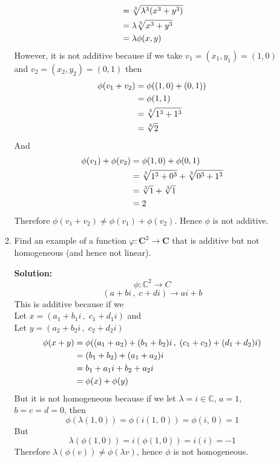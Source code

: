 \documentclass[12pt]{article}
\newcommand{\C}{\mathbb{C}}
\begin{document}
\begin{enumerate}
\begin{enumerate}
\begin{mybox}
\begin{align}
            &= \sqrt[3]{\lambda^3(x^3+y^3)} \notag\\
            &= \lambda \sqrt[3]{x^3+y^3} \notag\\
            &= \lambda \phi(x,y)\notag
        \end{align}
        However, it is not additive because if we take $v_1 = (x_1, y_1) = (1,0)$ and $v_2 = (x_2, y_2) = (0,1)$ then
        \begin{align}
            \phi(v_1 + v_2) &= \phi((1,0) + (0,1)) \notag\\
            &= \phi(1,1) \notag\\
            &= \sqrt[3]{1^3+1^3} \notag\\
            &= \sqrt[3]{2}\notag
        \end{align}
        And
        \begin{align}
           \phi(v_1) + \phi(v_2) &= \phi(1,0) + \phi(0,1) \notag\\
           &= \sqrt[3]{1^3 + 0^3} + \sqrt[3]{0^3 + 1^3} \notag\\
           &= \sqrt[3]{1} + \sqrt[3]{1} \notag\\
           &= 2\notag
        \end{align}
        Therefore $\phi(v_1+v_2) \neq \phi(v_1) + \phi(v_2)$. Hence $\phi$ is not additive.
        \end{mybox}
        \newpage
        \item Find an example of a function $\varphi : \mathbf{C}^2 \to \mathbf{C}$ that is additive but not homogeneous (and hence not linear).
        \begin{mybox}
        \textbf{Solution: }
        $$\phi : \C^2 \to C$$
        $$(a+bi\,,\;c+di) \to ai+b$$
        This is additive because if we 
        \\Let $x = (a_1+b_1i\,,\; c_1+d_1i)$ and
        \\Let $y = (a_2+b_2i\,,\; c_2+d_2i)$
        \begin{align}
            \phi(x+y) &= \phi((a_1+a_2)+(b_1+b_2)i\,,\; (c_1+c_2)+(d_1+d_2)i)\notag\\
            &= (b_1+b_2) + (a_1+a_2)i \notag\\
            &= b_1 + a_1i + b_2 + a_2i \notag\\
            &= \phi(x) + \phi(y)\notag
        \end{align}
        But it is not homogeneous because if we let $\lambda = i \in \C$, $a = 1$, $b = c = d = 0$, then
        $$\phi(\lambda (1, 0)) = \phi(i(1,\,0)) = \phi(i,\, 0) = 1$$
        But 
        $$\lambda(\phi(1,0)) = i(\phi(1,0)) = i(i) = -1$$
        Therefore $\lambda(\phi(v)) \neq \phi(\lambda v)$, hence $\phi$ is not homogeneous.
        \end{mybox}
    \end{enumerate}

\end{enumerate}
\end{document}

